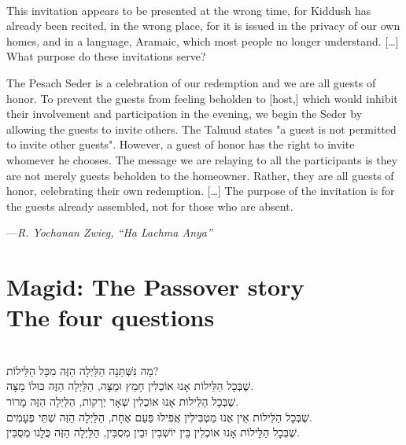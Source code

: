 \documentclass[letter,11pt,openany]{memoir}
\newcommand{\HgInst}[1]{{\noindent\sffamily{\bfseries{#1}}}}
\newcommand{\HgSource}[1]{\hfill{\small---\itshape{#1}}}
\newenvironment{HgEnglish}{\strut\\\noindent}{\vspace{1em}}
\newenvironment{HgHebrew}{\begin{hebrew}\strut\\\noindent\LARGE}{\end{hebrew}}
\begin{document}
\begin{HgEnglish}
This invitation appears to be presented at the wrong time, for Kiddush has
already been recited, in the wrong place, for it is issued in the privacy of our
own homes, and in a language, Aramaic, which most people no longer understand.
[\ldots] What purpose do these invitations serve?

The Pesach Seder is a celebration of our redemption and we are all guests of
honor. To prevent the guests from feeling beholden to [host,] which would
inhibit their involvement and participation in the evening, we begin the Seder
by allowing the guests to invite others. The Talmud states "a guest is not
permitted to invite other guests". However, a guest of honor has the right to
invite whomever he chooses. The message we are relaying to all the participants
is they are not merely guests beholden to the homeowner. Rather, they are all
guests of honor, celebrating their own redemption. [\ldots] The purpose of the
invitation is for the guests already assembled, not for those who are absent.

\HgSource{R. Yochanan Zwieg, ``Ha Lachma Anya''}
\end{HgEnglish}

\chapter*{Magid: The Passover story \\ {\LARGE The four questions}}

\vfill

\HgInst{The youngest person present recites:}

\begin{HgHebrew}
מַה נִּשְּׁתַּנָה הַלַּיְלָה הַזֶּה מִכָּל הַלֵּילוֹת? 
\\
שֶׁבְּכָל הַלֵּילוֹת אָנוּ אוֹכְלִין חָמֵץ וּמַצָּה,
הַלַּיְלָה הַזֶּה כּוּלוֹ מַצָּה. 
\\
שֶׁבְּכָל הַלֵּילוֹת אָנוּ אוֹכְלִין שְׁאָר יְרָקוֹת,
הַלַּיְלָה הַזֶּה מָרוֹר. 
\\
שֶׁבְּכָל הַלֵּילוֹת אֵין אֶנוּ מַטְבִּילִין אֲפִילוּ פַּעַם אֶחָת, 
הַלַּיְלָה הַזֶּה שְׁתֵּי פְעָמִים. 
\\
שֶׁבְּכָל הַלֵּילוֹת אָנוּ אוֹכְלִין בֵּין יוֹשְׁבִין וּבֵין מְסֻבִּין, 
הַלַּיְלָה הַזֶּה כֻּלָנו מְסֻבִּין. 
\end{HgHebrew}
\end{document}
